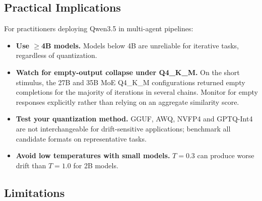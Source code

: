 \documentclass[11pt]{article}
\begin{document}
\subsection{Practical Implications}

For practitioners deploying Qwen3.5 in multi-agent pipelines:

\begin{itemize}[leftmargin=*]
  \item \textbf{Use $\geq$4B models.} Models below 4B are unreliable for
        iterative tasks, regardless of quantization.
  \item \textbf{Watch for empty-output collapse under Q4\_K\_M.} On the
        short stimulus, the 27B and 35B MoE Q4\_K\_M configurations
        returned empty completions for the majority of iterations in
        several chains. Monitor for empty responses explicitly rather than
        relying on an aggregate similarity score.
  \item \textbf{Test your quantization method.} GGUF, AWQ, NVFP4 and
        GPTQ-Int4 are not interchangeable for drift-sensitive
        applications; benchmark all candidate formats on representative
        tasks.
  \item \textbf{Avoid low temperatures with small models.} $T = 0.3$ can
        produce worse drift than $T = 1.0$ for 2B models.
\end{itemize}

\subsection{Limitations}
\end{document}
